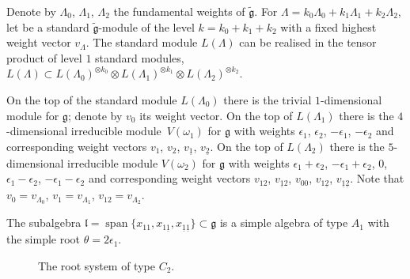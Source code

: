 \documentclass[10pt,a4paper]{amsart}
\newcommand{\g}
{{\mathfrak g}}
\newcommand{\lgg}
{{\mathfrak l}}
\newcommand{\gt}
{\tilde{{\mathfrak g}}}
\numberwithin{equation}{section}
\begin{document}
Denote by $\Lambda_0$, $\Lambda_1$, $\Lambda_2$ the fundamental weights of $\gt$. For
$\Lambda=k_0 \Lambda_0+k_1 \Lambda_1+k_2 \Lambda_2$, let  be a standard $\tilde{\mathfrak g}$-module of the level $k=k_0+k_1+k_2$ with a fixed highest weight vector $v_\Lambda$. The standard module $L(\Lambda)$ can be realised in the tensor product of level $1$ standard modules,
$L(\Lambda)\subset L(\Lambda_0)^{\otimes k_0}\otimes L(\Lambda_1)^{\otimes k_1} \otimes L(\Lambda_2)^{\otimes k_2}$.

On the top of the standard module $L(\Lambda_0)$ there is the trivial $1$-dimensional module for $\g$; denote by $v_0$ its weight vector. On the top of $L(\Lambda_1)$ there is the $4$-dimensional irreducible module~$V(\omega_1)$ for $\g$ with weights $\epsilon_1$, $\epsilon_2$, $-\epsilon_1$, $-\epsilon_2$ and corresponding weight vectors $v_1$, $v_2$, $v_{\underline{1}}$, $v_{\underline{2}}$. On the top of $L(\Lambda_2)$ there is the $5$-dimensional irreducible module $V(\omega_2)$ for $\g$ with weights $\epsilon_1+\epsilon_2$, $-\epsilon_1+\epsilon_2$, $0$, $\epsilon_1-\epsilon_2$, $-\epsilon_1-\epsilon_2$ and corresponding weight vectors $v_{12}$, $v_{\underline{1}2}$, $v_{00}$, $v_{1 \underline{2}}$, $v_{\underline{1}\underline{2}}$. Note that $v_0=v_{\Lambda_0}$, $v_1=v_{\Lambda_1}$, $v_{12}=v_{\Lambda_2}$.

The subalgebra $\lgg=\operatorname{span}\{x_{11},x_{1 \underline{1}}, x_{\underline{1}\underline{1}}\}\subset\g$
is a simple algebra of type $A_1$ with the simple root $\theta=2\epsilon_1$.

\begin{figure}[ht]\centering
 \caption{The root system of type $C_2$.} \label{C2}
\end{figure}
\end{document}
